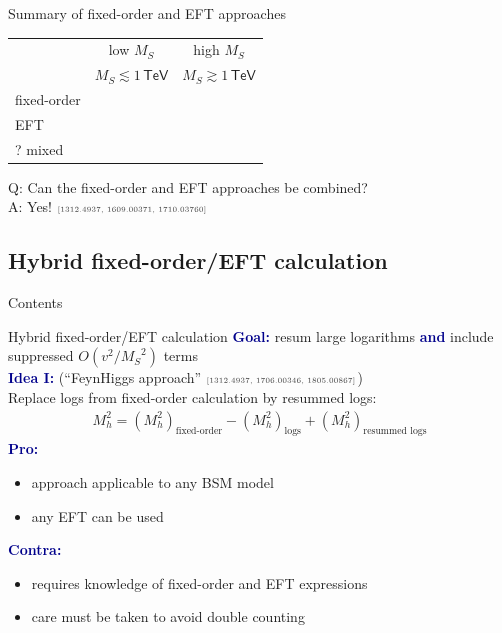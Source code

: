 \documentclass[hyperref={pdfpagelabels=false},ngerman]{beamer}
\newcommand{\cmark}{\ding{51}}%
\newcommand{\xmark}{\ding{55}}%
\newcommand{\eh}[1]{\,\mathsf{#1}}
\newcommand{\ok}{\textcolor{darkgreen}{\cmark}}
\newcommand{\notok}{\textcolor{red}{\xmark}}
\newcommand{\MS}{\ensuremath{M_S}}
\newcommand{\mycite}[1]{\ensuremath{\text{\textcolor{darkgray}{\tiny [#1]}}}}
\renewcommand{\emph}[1]{\textbf{\textcolor{darkblue}{#1}}}
\begin{document}
\begin{frame}{Summary of fixed-order and EFT approaches}
  \begin{center}
    \begin{tabular}{lcc}
      \toprule
                  & low $\MS$ & high $\MS$ \\
                  & $\MS \lesssim 1\eh{TeV}$ & $\MS \gtrsim 1\eh{TeV}$ \\
      \midrule
      fixed-order & \ok       & \notok     \\
      EFT         & \notok    & \ok        \\
      ? mixed     & \ok       & \ok        \\
      \bottomrule
    \end{tabular}
  \end{center}
  \vspace{2em}
  Q: Can the fixed-order and EFT approaches be combined? \\[1em]
  A: Yes!  \mycite{1312.4937, 1609.00371, 1710.03760}
\end{frame}


\subsection{Hybrid fixed-order/EFT calculation}

\begin{frame}{Contents}
\end{frame}

\begin{frame}{Hybrid fixed-order/EFT calculation}
  \emph{Goal:} resum large logarithms \emph{and} include suppressed
  $O(v^2/\MS^2)$ terms
  \\[2em]
  \emph{Idea I:} (``FeynHiggs approach'' \mycite{1312.4937, 1706.00346, 1805.00867})\\
  Replace logs from fixed-order calculation by resummed logs:
  \begin{align*}
    M_h^2 = (M_h^2)_{\text{fixed-order}} - (M_h^2)_{\text{logs}} + (M_h^2)_{\text{resummed logs}}
  \end{align*}
  \emph{Pro:}
  \begin{itemize}
  \item[\ok] approach applicable to any BSM model
  \item[\ok] any EFT can be used
  \end{itemize}
  \emph{Contra:}
  \begin{itemize}
  \item[\notok] requires knowledge of fixed-order and EFT expressions
  \item[\notok] care must be taken to avoid double counting
  \end{itemize}
\end{frame}
\end{document}
